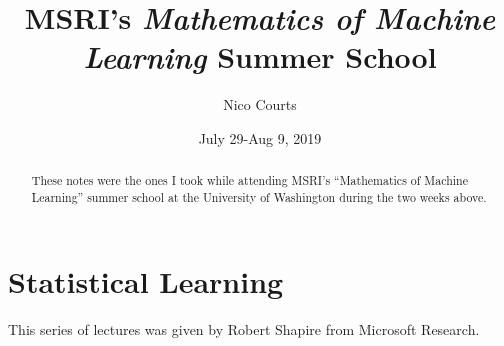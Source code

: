 \documentclass[12pt]{article}
\begin{document}
\title{MSRI's \textit{Mathematics of Machine Learning} Summer School\vspace{-1ex}}
\author{Nico Courts}
\date{July 29-Aug 9, 2019}
\maketitle

\renewcommand{\abstractname}{Introduction}
\begin{abstract}
	These notes were the ones I took while attending MSRI's ``Mathematics of Machine Learning'' summer school
	at the University of Washington during the two weeks above.
\end{abstract}

\section{Statistical Learning}
This series of lectures was given by Robert Shapire from Microsoft Research.
\end{document}
